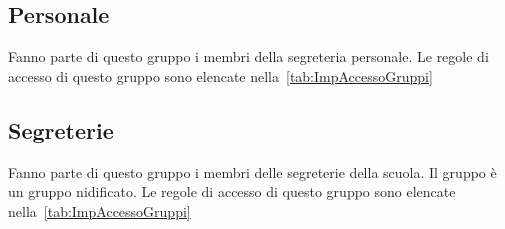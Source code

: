 \subsection{Personale}
Fanno parte di questo gruppo i membri della segreteria personale. Le  regole di accesso di questo gruppo sono elencate nella~\cref{tab:ImpAccessoGruppi}
\subsection{Segreterie}
Fanno parte di questo gruppo i membri delle segreterie della scuola. Il gruppo è un gruppo nidificato. Le  regole di accesso di questo gruppo sono elencate nella~\cref{tab:ImpAccessoGruppi}
